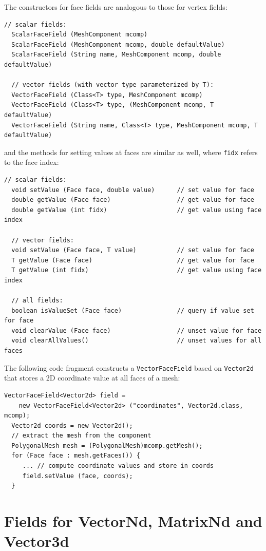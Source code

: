 The constructors for face fields are analogous to those
for vertex fields:
%
\begin{lstlisting}[]
  // scalar fields:
  ScalarFaceField (MeshComponent mcomp)
  ScalarFaceField (MeshComponent mcomp, double defaultValue)
  ScalarFaceField (String name, MeshComponent mcomp, double defaultValue)

  // vector fields (with vector type parameterized by T):
  VectorFaceField (Class<T> type, MeshComponent mcomp)
  VectorFaceField (Class<T> type, (MeshComponent mcomp, T defaultValue)
  VectorFaceField (String name, Class<T> type, MeshComponent mcomp, T defaultValue)
\end{lstlisting}
%
and the methods for setting values at faces are similar as
well, where {\tt fidx} refers to the face index:
%
\begin{lstlisting}[]
  // scalar fields:
  void setValue (Face face, double value)      // set value for face
  double getValue (Face face)                  // get value for face
  double getValue (int fidx)                   // get value using face index

  // vector fields:
  void setValue (Face face, T value)           // set value for face
  T getValue (Face face)                       // get value for face
  T getValue (int fidx)                        // get value using face index

  // all fields:
  boolean isValueSet (Face face)               // query if value set for face
  void clearValue (Face face)                  // unset value for face
  void clearAllValues()                        // unset values for all faces
\end{lstlisting}
%

The following code fragment constructs a {\tt VectorFaceField} based
on {\tt Vector2d} that stores a 2D coordinate value at all faces
of a mesh:
%
\begin{lstlisting}[]
  VectorFaceField<Vector2d> field =
    new VectorFaceField<Vector2d> ("coordinates", Vector2d.class, mcomp);
  Vector2d coords = new Vector2d();
  // extract the mesh from the component
  PolygonalMesh mesh = (PolygonalMesh)mcomp.getMesh();
  for (Face face : mesh.getFaces()) {
     ... // compute coordinate values and store in coords
     field.setValue (face, coords);
  }
\end{lstlisting}
%

\section{Fields for VectorNd, MatrixNd and Vector3d}
\label{sec:wrapperFields}

